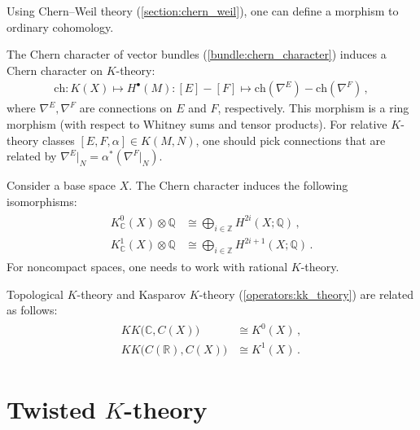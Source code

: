     Using Chern--Weil theory (\cref{section:chern_weil}), one can define a morphism to ordinary cohomology.
    \begin{construct}\label{k:chern_character}
        The Chern character of vector bundles (\cref{bundle:chern_character}) induces a Chern character on $K$-theory:
        \begin{gather}
            \mathrm{ch}:K(X)\mapsto H^\bullet(M):[E]-[F]\mapsto \mathrm{ch}(\nabla^E)-\mathrm{ch}(\nabla^F)\,,
        \end{gather}
        where $\nabla^E,\nabla^F$ are connections on $E$ and $F$, respectively. This morphism is a ring morphism (with respect to Whitney sums and tensor products). For relative $K$-theory classes $[E,F,\alpha]\in K(M,N)$, one should pick connections that are related by $\nabla^E|_N=\alpha^*(\nabla^F|_N)$.
    \end{construct}
    \begin{theorem}
        Consider a base space $X$. The Chern character induces the following isomorphisms:
        \begin{gather}
            \begin{aligned}
                K^0_{\mathbb{C}}(X)\otimes\mathbb{Q}&\cong\bigoplus_{i\in\mathbb{Z}}H^{2i}(X;\mathbb{Q})\,,\\
                K^1_{\mathbb{C}}(X)\otimes\mathbb{Q}&\cong\bigoplus_{i\in\mathbb{Z}}H^{2i+1}(X;\mathbb{Q})\,.
            \end{aligned}
        \end{gather}
        For noncompact spaces, one needs to work with rational $K$-theory.
    \end{theorem}

    \begin{property}[$K\!K$-theory]\label{k:topological_kk_theory}
        Topological $K$-theory and Kasparov $K$-theory (\cref{operators:kk_theory}) are related as follows:
        \begin{gather}
            \begin{aligned}
                K\!K\bigl(\mathbb{C},C(X)\bigr)&\cong K^0(X)\,,\\
                K\!K\bigl(C(\mathbb{R}),C(X)\bigr)&\cong K^1(X)\,.
            \end{aligned}
        \end{gather}
    \end{property}

\section{\texorpdfstring{Twisted $K$-theory}{Twisted K-theory}}\label{section:twisted_k_theory}


